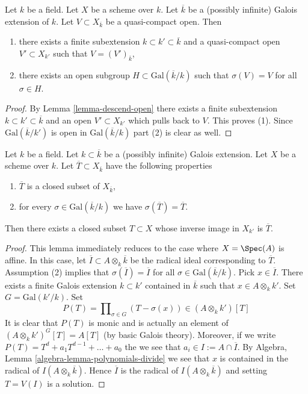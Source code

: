 \begin{lemma}
\label{lemma-Galois-action-quasi-compact-open}
Let $k$ be a field. Let $X$ be a scheme over $k$.
Let $\overline{k}$ be a (possibly infinite) Galois extension of $k$.
Let $V \subset X_{\overline{k}}$ be a quasi-compact open.
Then
\begin{enumerate}
\item there exists a finite subextension $k \subset k' \subset \overline{k}$
and a quasi-compact open $V' \subset X_{k'}$ such that
$V = (V')_{\overline{k}}$,
\item there exists an open subgroup $H \subset \text{Gal}(\overline{k}/k)$
such that $\sigma(V) = V$ for all $\sigma \in H$.
\end{enumerate}
\end{lemma}

\begin{proof}
By Lemma \ref{lemma-descend-open} there exists a finite subextension
$k \subset k' \subset \overline{k}$ and an open $V' \subset X_{k'}$
which pulls back to $V$. This proves (1). Since $\text{Gal}(\overline{k}/k')$
is open in $\text{Gal}(\overline{k}/k)$ part (2) is clear as well.
\end{proof}

\begin{lemma}
\label{lemma-closed-fixed-by-Galois}
Let $k$ be a field. Let $k \subset \overline{k}$ be a (possibly infinite)
Galois extension. Let $X$ be a scheme over $k$. Let
$\overline{T} \subset X_{\overline{k}}$ have the following properties
\begin{enumerate}
\item $\overline{T}$ is a closed subset of $X_{\overline{k}}$,
\item for every $\sigma \in \text{Gal}(\overline{k}/k)$
we have $\sigma(\overline{T}) = \overline{T}$.
\end{enumerate}
Then there exists a closed subset $T \subset X$ whose inverse image
in $X_{k'}$ is $\overline{T}$.
\end{lemma}

\begin{proof}
This lemma immediately reduces to the case where $X = \Spec(A)$
is affine. In this case, let $\overline{I} \subset A \otimes_k \overline{k}$
be the radical ideal corresponding to $\overline{T}$.
Assumption (2) implies that $\sigma(\overline{I}) = \overline{I}$
for all $\sigma \in \text{Gal}(\overline{k}/k)$.
Pick $x \in \overline{I}$. There exists a finite Galois extension
$k \subset k'$ contained in $\overline{k}$ such that $x \in A \otimes_k k'$.
Set $G = \text{Gal}(k'/k)$. Set
$$
P(T) = \prod\nolimits_{\sigma \in G} (T - \sigma(x)) \in (A \otimes_k k')[T]
$$
It is clear that $P(T)$ is monic and is actually an element of
$(A \otimes_k k')^G[T] = A[T]$ (by basic Galois theory).
Moreover, if we write $P(T) = T^d + a_1T^{d - 1} + \ldots + a_0$
the we see that $a_i \in I := A \cap \overline{I}$. By
Algebra, Lemma \ref{algebra-lemma-polynomials-divide}
we see that $x$ is contained in the radical of $I(A \otimes_k \overline{k})$.
Hence $\overline{I}$ is the radical of $I(A \otimes_k \overline{k})$ and
setting $T = V(I)$ is a solution.
\end{proof}

